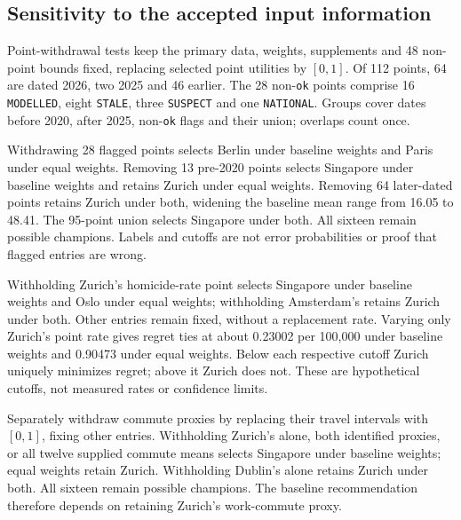 \subsection{Sensitivity to the accepted input information}\label{sec:sourcepolicy}
Point-withdrawal tests keep the primary data, weights, supplements and 48
non-point bounds fixed, replacing selected point utilities by $[0,1]$.
Of 112 points, 64 are dated 2026, two 2025 and 46 earlier. The 28
non-\texttt{ok} points comprise 16 \texttt{MODELLED}, eight \texttt{STALE},
three \texttt{SUSPECT} and one \texttt{NATIONAL}. Groups cover dates before
2020, after 2025, non-\texttt{ok} flags and their union; overlaps count once.



Withdrawing 28 flagged points selects Berlin under baseline weights and Paris
under equal weights. Removing 13 pre-2020 points selects Singapore under
baseline weights and retains Zurich under equal weights. Removing 64
later-dated points retains Zurich under both, widening the baseline mean
range from 16.05 to 48.41. The 95-point union selects Singapore under both.
All sixteen remain possible champions. Labels and cutoffs are not error
probabilities or proof that flagged entries are wrong.

Withholding Zurich's homicide-rate point selects Singapore under baseline
weights and Oslo under equal weights; withholding Amsterdam's retains Zurich
under both. Other entries remain fixed, without a replacement rate.
Varying only Zurich's point rate gives regret ties at about 0.23002 per 100,000
under baseline weights and 0.90473 under equal weights. Below each respective
cutoff Zurich uniquely minimizes regret; above it Zurich does not. These are
hypothetical cutoffs, not measured rates or confidence limits.

Separately withdraw commute proxies by replacing their travel intervals with
$[0,1]$, fixing other entries. Withholding Zurich's alone, both identified
proxies, or all twelve supplied commute means selects Singapore under baseline
weights; equal weights retain Zurich. Withholding Dublin's alone retains Zurich
under both. All sixteen remain possible champions. The baseline recommendation
therefore depends on retaining Zurich's work-commute proxy.
